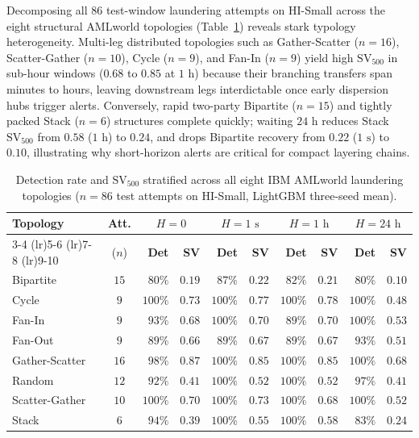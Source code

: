 \documentclass[pdflatex,sn-mathphys,Numbered]{sn-jnl}
\theoremstyle{thmstyleone}
\begin{document}
Decomposing all $86$ test-window laundering attempts on HI-Small across the eight structural AMLworld topologies (Table~\ref{tab:typology_breakdown}) reveals stark typology heterogeneity. Multi-leg distributed topologies such as Gather-Scatter ($n = 16$), Scatter-Gather ($n = 10$), Cycle ($n = 9$), and Fan-In ($n = 9$) yield high $\text{SV}_{500}$ in sub-hour windows ($0.68$ to $0.85$ at $1\text{ h}$) because their branching transfers span minutes to hours, leaving downstream legs interdictable once early dispersion hubs trigger alerts. Conversely, rapid two-party Bipartite ($n = 15$) and tightly packed Stack ($n = 6$) structures complete quickly; waiting $24\text{ h}$ reduces Stack $\text{SV}_{500}$ from $0.58$ ($1\text{ h}$) to $0.24$, and drops Bipartite recovery from $0.22$ ($1\text{ s}$) to $0.10$, illustrating why short-horizon alerts are critical for compact layering chains.

\begin{table}[t]
\centering
\caption{Detection rate and $\text{SV}_{500}$ stratified across all eight IBM AMLworld laundering topologies ($n = 86$ test attempts on HI-Small, LightGBM three-seed mean).}
\label{tab:typology_breakdown}
\scriptsize
\setlength{\tabcolsep}{3.2pt}
\begin{tabular}{@{}lcrrrrrrrr@{}}
\toprule
\textbf{Topology} & \textbf{Att.} & \multicolumn{2}{c}{\textbf{$H = 0$}} & \multicolumn{2}{c}{\textbf{$H = 1\text{ s}$}} & \multicolumn{2}{c}{\textbf{$H = 1\text{ h}$}} & \multicolumn{2}{c}{\textbf{$H = 24\text{ h}$}} \\
\cmidrule(lr){3-4} \cmidrule(lr){5-6} \cmidrule(lr){7-8} \cmidrule(lr){9-10}
 & ($n$) & \textbf{Det} & \textbf{SV} & \textbf{Det} & \textbf{SV} & \textbf{Det} & \textbf{SV} & \textbf{Det} & \textbf{SV} \\
\midrule
Bipartite & $15$ & $80\%$ & $0.19$ & $87\%$ & $0.22$ & $82\%$ & $0.21$ & $80\%$ & $0.10$ \\
Cycle & $9$ & $100\%$ & $0.73$ & $100\%$ & $0.77$ & $100\%$ & $0.78$ & $100\%$ & $0.48$ \\
Fan-In & $9$ & $93\%$ & $0.68$ & $100\%$ & $0.70$ & $89\%$ & $0.70$ & $100\%$ & $0.53$ \\
Fan-Out & $9$ & $89\%$ & $0.66$ & $89\%$ & $0.67$ & $89\%$ & $0.67$ & $93\%$ & $0.51$ \\
Gather-Scatter & $16$ & $98\%$ & $0.87$ & $100\%$ & $0.85$ & $100\%$ & $0.85$ & $100\%$ & $0.68$ \\
Random & $12$ & $92\%$ & $0.41$ & $100\%$ & $0.52$ & $100\%$ & $0.52$ & $97\%$ & $0.41$ \\
Scatter-Gather & $10$ & $100\%$ & $0.70$ & $100\%$ & $0.73$ & $100\%$ & $0.68$ & $100\%$ & $0.52$ \\
Stack & $6$ & $94\%$ & $0.39$ & $100\%$ & $0.55$ & $100\%$ & $0.58$ & $83\%$ & $0.24$ \\
\bottomrule
\end{tabular}
\end{table}
\end{document}
